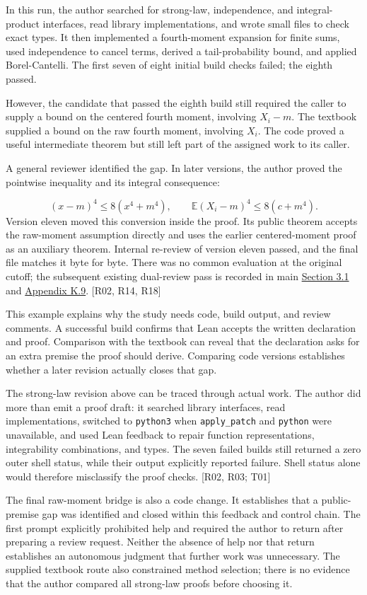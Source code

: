 In this run, the author searched for strong-law, independence, and integral-product interfaces, read library implementations, and wrote small files to check exact types. It then implemented a fourth-moment expansion for finite sums, used independence to cancel terms, derived a tail-probability bound, and applied Borel-Cantelli. The first seven of eight initial build checks failed; the eighth passed.

However, the candidate that passed the eighth build still required the caller to supply a bound on the centered fourth moment, involving $X_i-m$. The textbook supplied a bound on the raw fourth moment, involving $X_i$. The code proved a useful intermediate theorem but still left part of the assigned work to its caller.

A general reviewer identified the gap. In later versions, the author proved the pointwise inequality and its integral consequence:

\[
(x-m)^4\le 8(x^4+m^4),\qquad
\mathbb{E}(X_i-m)^4\le 8(c+m^4).
\]
Version eleven moved this conversion inside the proof. Its public theorem accepts the raw-moment assumption directly and uses the earlier centered-moment proof as an auxiliary theorem. Internal re-review of version eleven passed, and the final file matches it byte for byte. There was no common evaluation at the original cutoff; the subsequent existing dual-review pass is recorded in main \href{en.pdf\#section-3-1}{Section 3.1} and \hyperlink{k9}{Appendix K.9}. [R02, R14, R18]

This example explains why the study needs code, build output, and review comments. A successful build confirms that Lean accepts the written declaration and proof. Comparison with the textbook can reveal that the declaration asks for an extra premise the proof should derive. Comparing code versions establishes whether a later revision actually closes that gap.

The strong-law revision above can be traced through actual work. The author did more than emit a proof draft: it searched library interfaces, read implementations, switched to \nolinkurl{python3} when \nolinkurl{apply_patch} and \nolinkurl{python} were unavailable, and used Lean feedback to repair function representations, integrability combinations, and types. The seven failed builds still returned a zero outer shell status, while their output explicitly reported failure. Shell status alone would therefore misclassify the proof checks. [R02, R03; T01]

The final raw-moment bridge is also a code change. It establishes that a public-premise gap was identified and closed within this feedback and control chain. The first prompt explicitly prohibited help and required the author to return after preparing a review request. Neither the absence of help nor that return establishes an autonomous judgment that further work was unnecessary. The supplied textbook route also constrained method selection; there is no evidence that the author compared all strong-law proofs before choosing it.

